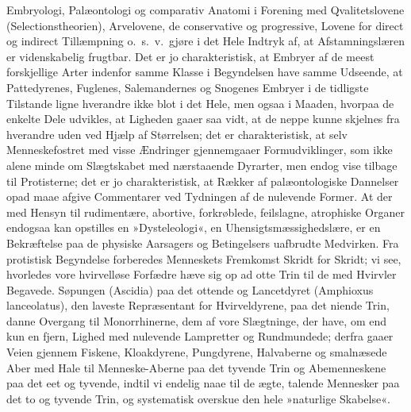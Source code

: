 \documentclass[12pt]{book}
\newcommand{\apage}[1]{\marginnote{\footnotesize\textit{[#1]}}}
\begin{document}
Embryologi, Palæontologi og comparativ Anatomi i Forening med Qvalitetslovene
(Selectionstheorien), Arvelovene, de conservative og progressive, Lovene
for direct og indirect Tillæmpning o.\ s.\ v.\ gjøre i det Hele Indtryk af, at
Afstamningslæren er videnskabelig frugtbar. Det er jo charakteristisk, at
Embryer af de meest forskjellige Arter indenfor samme Klasse i Begyndelsen
have samme Udseende, at Pattedyrenes, Fuglenes, Salemandernes og Snogenes
Embryer i de tidligste Tilstande ligne hverandre ikke blot i det Hele, men
ogsaa i Maaden, hvorpaa de enkelte Dele udvikles, at Ligheden gaaer saa
vidt, at de neppe kunne skjelnes fra hverandre uden ved Hjælp af
Størrelsen; det er charakteristisk, at selv Menneskefostret med visse
Ændringer gjennemgaaer Formudviklinger, som ikke alene minde om Slægtskabet
med nærstaaende Dyrarter, men endog vise tilbage til Protisterne; det er jo
charakteristisk, at Rækker af palæontologiske Dannelser \apage{199} opad maae afgive
Commentarer ved Tydningen af de nulevende Former. At der med Hensyn til
rudimentære, abortive, forkrøblede, feilslagne, atrophiske Organer endogsaa
kan opstilles en »Dysteleologi«, en Uhensigtsmæssighedslære, er en
Bekræftelse paa de physiske Aarsagers og Betingelsers uafbrudte Medvirken.
Fra protistisk Begyndelse forberedes Menneskets Fremkomst Skridt for
Skridt; vi see, hvorledes vore hvirvelløse Forfædre hæve sig op ad otte
Trin til de med Hvirvler Begavede. Søpungen (Ascidia) paa det
ottende og Lancetdyret (Amphioxus lanceolatus), den laveste
Repræsentant for Hvirveldyrene, paa det niende Trin, danne Overgang til
Monorrhinerne, dem af vore Slægtninge, der have, om end kun en fjern,
Lighed med nulevende Lampretter og Rundmundede; derfra gaaer Veien gjennem
Fiskene, Kloakdyrene, Pungdyrene, Halvaberne og smalnæsede Aber med Hale
til Menneske-Aberne paa det tyvende Trin og Abemenneskene paa det eet og
tyvende, indtil vi endelig naae til de ægte, talende Mennesker paa det to
og tyvende Trin, og systematisk overskue den hele »naturlige Skabelse«.
\end{document}
